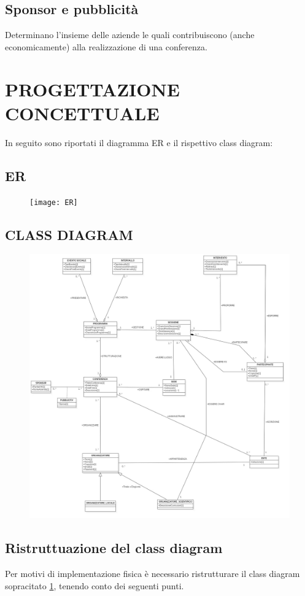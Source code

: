 \documentclass[a4page]{article}
\begin{document}
\subsection{Sponsor e pubblicità}
Determinano l'insieme delle aziende le quali contribuiscono (anche economicamente) alla realizzazione di una conferenza.
\newpage
\section{PROGETTAZIONE CONCETTUALE}
In seguito sono riportati il diagramma ER e il rispettivo class diagram:
\subsection{ER}
\begin{figure}[h!]
\centering
\texttt{[image: ER]}
\end{figure}
\newpage
\subsection{CLASS DIAGRAM}
\begin{figure}[h!]
\centering
\includegraphics[width=17cm]{CSNR}
\label{mycsnr}
\end{figure}
\newpage
\subsection{Ristruttuazione del class diagram}
Per motivi di implementazione fisica è necessario ristrutturare il class diagram sopracitato \ref{mycsnr}, tenendo conto dei seguenti punti.
\end{document}
